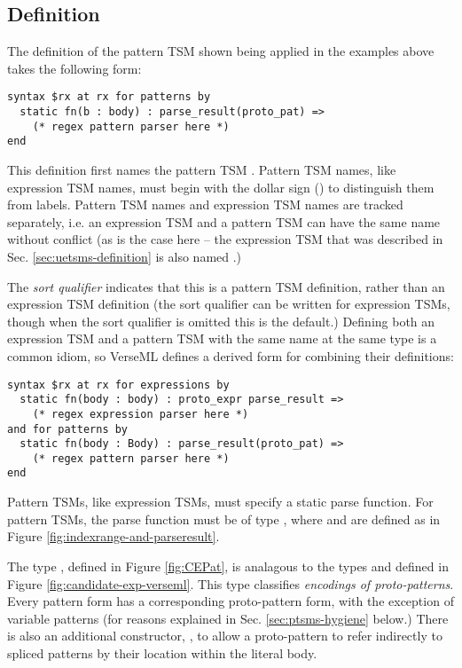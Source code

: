 {\subsection{Definition}\label{sec:ptsms-definition}
The definition of the pattern TSM  shown being applied in the examples above takes the following form:
\begin{lstlisting}[numbers=none]
syntax $rx at rx for patterns by 
  static fn(b : body) : parse_result(proto_pat) =>
    (* regex pattern parser here *)
end 
\end{lstlisting}
This definition first names the pattern TSM . Pattern TSM names, like expression TSM names, must begin with the dollar sign (\li{#\dolla#}) to distinguish them from labels. Pattern TSM names and expression TSM names are tracked separately, i.e. an expression TSM and a pattern TSM can have the same name without conflict (as is the case here -- the expression TSM that was described in Sec. \ref{sec:uetsms-definition} is also named .) 

The \emph{sort qualifier}  indicates that this is a pattern TSM definition, rather than an expression TSM definition (the sort qualifier  can be written for expression TSMs, though when the sort qualifier is omitted this is the default.) Defining both an expression TSM and a pattern TSM with the same name at the same type is a common idiom, so VerseML defines a derived form for combining their definitions:
\begin{lstlisting}[numbers=none,morekeywords={andfor}]
syntax $rx at rx for expressions by
  static fn(body : body) : proto_expr parse_result => 
    (* regex expression parser here *)
and for patterns by 
  static fn(body : Body) : parse_result(proto_pat) => 
    (* regex pattern parser here *)
end
\end{lstlisting}

Pattern TSMs, like expression TSMs, must specify a static {parse function}. For pattern TSMs, the parse function must be of type , where  and  are defined as in Figure \ref{fig:indexrange-and-parseresult}. 

The type , defined in Figure \ref{fig:CEPat}, is analagous to the types  and  defined in Figure \ref{fig:candidate-exp-verseml}. This type classifies \emph{encodings of proto-patterns}. Every pattern form has a corresponding proto-pattern form, with the exception of variable patterns (for reasons explained in Sec. \ref{sec:ptsms-hygiene} below.) There is also an additional constructor, , to allow a proto-pattern to refer indirectly to spliced patterns by their location within the literal body. 

}
